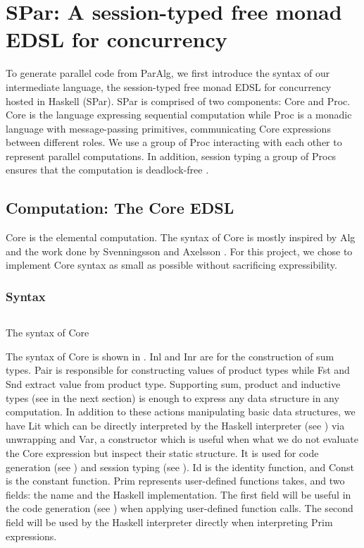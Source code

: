 \chapter{SPar: A session-typed free monad EDSL for concurrency} \label{chap:spar}
To generate parallel code from ParAlg, we first introduce the syntax of our intermediate language, the session-typed free monad EDSL for concurrency hosted in Haskell (SPar). SPar is comprised of two components: Core and Proc. Core is the language expressing sequential computation while Proc is a monadic language with message-passing primitives, communicating Core expressions between different roles. We use a group of Proc interacting with each other to represent parallel computations. In addition, session typing a group of Procs ensures that the computation is deadlock-free \cite{langeVerifyingAsynchronousInteractions2019}.
\section{Computation: The Core EDSL}
Core is the elemental computation. The syntax of Core is mostly inspired by Alg \cite{AlgebraicMultipartyProtocol} and the work done by Svenningsson and Axelsson \cite{svenningssonCombiningDeepShallow2015}. For this project, we chose to implement Core syntax as small as possible without sacrificing expressibility.
\subsection{Syntax}
\begin{listing}[ht]
    \inputminted{Haskell}{spar/core.hs}
    \caption{The syntax of Core}
    \label{spar:code:core}
\end{listing}
The syntax of Core is shown in . Inl and Inr are for the construction of sum types. Pair is responsible for constructing values of product types while Fst and Snd extract value from product type. Supporting sum, product and inductive types (see in the next section) is enough to express any data structure in any computation. In addition to these actions manipulating basic data structures, we have Lit which can be directly interpreted by the Haskell interpreter (see ) via unwrapping and Var, a constructor which is useful when what we do not evaluate the Core expression but inspect their static structure. It is used for code generation (see ) and session typing (see ). Id is the identity function, and Const is the constant function. Prim represents user-defined functions takes, and two fields: the name and the Haskell implementation. The first field will be useful in the code generation (see ) when applying user-defined function calls. The second field will be used by the Haskell interpreter directly when interpreting Prim expressions.    

